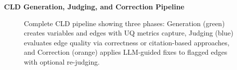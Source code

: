 \documentclass[12pt]{article}
\begin{document}
\pagestyle{empty}

\begin{center}
\textbf{\Large CLD Generation, Judging, and Correction Pipeline}
\end{center}

\vspace{0.5cm}

\begin{figure}[h]
\centering
\resizebox{0.95\textwidth}{!}{%

}
\caption{Complete CLD pipeline showing three phases: Generation (green) creates variables and edges with UQ metrics capture, Judging (blue) evaluates edge quality via correctness or citation-based approaches, and Correction (orange) applies LLM-guided fixes to flagged edges with optional re-judging.}
\end{figure}
\end{document}
